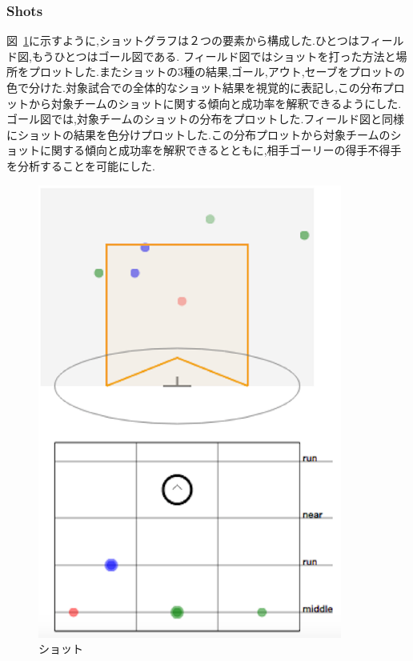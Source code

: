 \documentclass[sotsuron]{kuee}
\begin{document}
			\subsubsection{Shots}
				図~\ref{fig:shots}に示すように,ショットグラフは２つの要素から構成した.ひとつはフィールド図,もうひとつはゴール図である.
				フィールド図ではショットを打った方法と場所をプロットした.またショットの3種の結果,ゴール,アウト,セーブをプロットの色で分けた.対象試合での全体的なショット結果を視覚的に表記し,この分布プロットから対象チームのショットに関する傾向と成功率を解釈できるようにした.
				ゴール図では,対象チームのショットの分布をプロットした.フィールド図と同様にショットの結果を色分けプロットした.この分布プロットから対象チームのショットに関する傾向と成功率を解釈できるとともに,相手ゴーリーの得手不得手を分析することを可能にした.
					\begin{figure}
						\begin{center}
							\includegraphics[width=10cm]{./eps/shots.eps}
						\end{center}
						\caption{ショット}
				  		\label{fig:shots}
					\end{figure}
\end{document}
